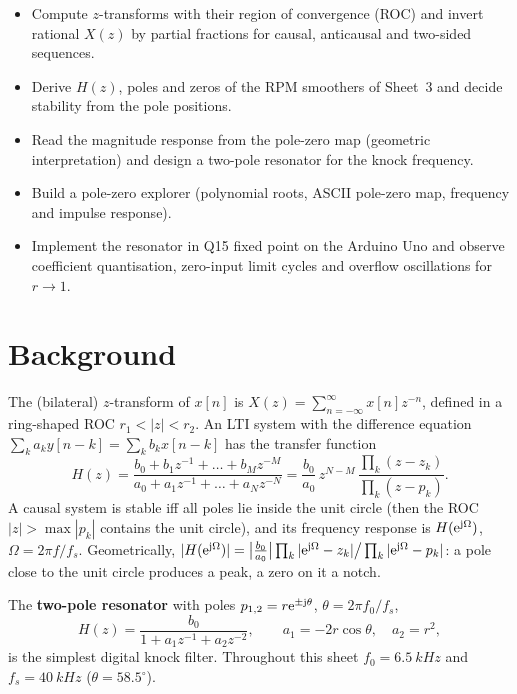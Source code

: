 
\begin{goals}
\begin{itemize}
  \item Compute $z$-transforms with their region of convergence (ROC) and
    invert rational $X(z)$ by partial fractions for causal, anticausal and
    two-sided sequences.
  \item Derive $H(z)$, poles and zeros of the RPM smoothers of Sheet~3 and decide
    stability from the pole positions.
  \item Read the magnitude response from the pole-zero map (geometric
    interpretation) and design a two-pole resonator for the knock frequency.
  \item Build a pole-zero explorer (polynomial roots, ASCII pole-zero map,
    frequency and impulse response).
  \item Implement the resonator in Q15 fixed point on the Arduino Uno and
    observe coefficient quantisation, zero-input limit cycles and overflow
    oscillations for $r\to1$.
\end{itemize}
\end{goals}

\section*{Background}

The (bilateral) $z$-transform of $x[n]$ is $X(z)=\sum_{n=-\infty}^{\infty}x[n]z^{-n}$,
defined in a ring-shaped ROC $r_1<|z|<r_2$. An LTI system with the difference
equation $\sum_k a_ky[n-k]=\sum_k b_kx[n-k]$ has the transfer function
\[
  H(z)=\frac{b_0+b_1z^{-1}+\dots+b_Mz^{-M}}{a_0+a_1z^{-1}+\dots+a_Nz^{-N}}
      =\frac{b_0}{a_0}\,z^{N-M}\,\frac{\prod_k(z-z_k)}{\prod_k(z-p_k)} .
\]
A causal system is stable iff all poles lie inside the unit circle (then the
ROC $|z|>\max|p_k|$ contains the unit circle), and its frequency response is
$H(\mathrm{e}^{\mathrm{j}\Omega})$, $\Omega=2\pi f/f_s$. Geometrically,
$|H(\mathrm{e}^{\mathrm{j}\Omega})|=\bigl|\frac{b_0}{a_0}\bigr|\prod_k|\mathrm{e}^{\mathrm{j}\Omega}-z_k|\big/\prod_k|\mathrm{e}^{\mathrm{j}\Omega}-p_k|$:
a pole close to the unit circle produces a peak, a zero on it a notch.

The \textbf{two-pole resonator} with poles $p_{1,2}=r\mathrm{e}^{\pm\mathrm{j}\theta}$,
$\theta=2\pi f_0/f_s$,
\begin{equation}
  H(z)=\frac{b_0}{1+a_1z^{-1}+a_2z^{-2}},\qquad a_1=-2r\cos\theta,\quad a_2=r^2,
  \label{eq:s9res}
\end{equation}
is the simplest digital knock filter. Throughout this sheet
$f_0=\SI{6.5}{kHz}$ and $f_s=\SI{40}{kHz}$ ($\theta=58.5^\circ$).

